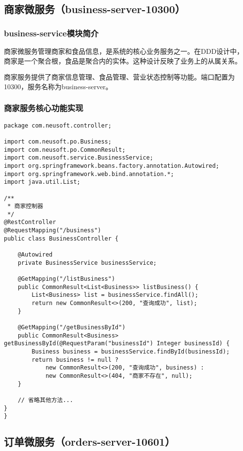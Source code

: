 \documentclass[a4paper,12pt]{article}
\begin{document}
\subsection{商家微服务（business-server-10300）}

\subsubsection{business-service模块简介}

商家微服务管理商家和食品信息，是系统的核心业务服务之一。在DDD设计中，商家是一个聚合根，食品是聚合内的实体。这种设计反映了业务上的从属关系。

商家服务提供了商家信息管理、食品管理、营业状态控制等功能。端口配置为10300，服务名称为business-server。

\subsubsection{商家服务核心功能实现}

\begin{lstlisting}[caption=商家控制器实现]
package com.neusoft.controller;

import com.neusoft.po.Business;
import com.neusoft.po.CommonResult;
import com.neusoft.service.BusinessService;
import org.springframework.beans.factory.annotation.Autowired;
import org.springframework.web.bind.annotation.*;
import java.util.List;

/**
 * 商家控制器
 */
@RestController
@RequestMapping("/business")
public class BusinessController {
    
    @Autowired
    private BusinessService businessService;
    
    @GetMapping("/listBusiness")
    public CommonResult<List<Business>> listBusiness() {
        List<Business> list = businessService.findAll();
        return new CommonResult<>(200, "查询成功", list);
    }
    
    @GetMapping("/getBusinessById")
    public CommonResult<Business> getBusinessById(@RequestParam("businessId") Integer businessId) {
        Business business = businessService.findById(businessId);
        return business != null ?
            new CommonResult<>(200, "查询成功", business) :
            new CommonResult<>(404, "商家不存在", null);
    }
    
    // 省略其他方法...
}
}
\end{lstlisting}

\subsection{订单微服务（orders-server-10601）}
\end{document}
